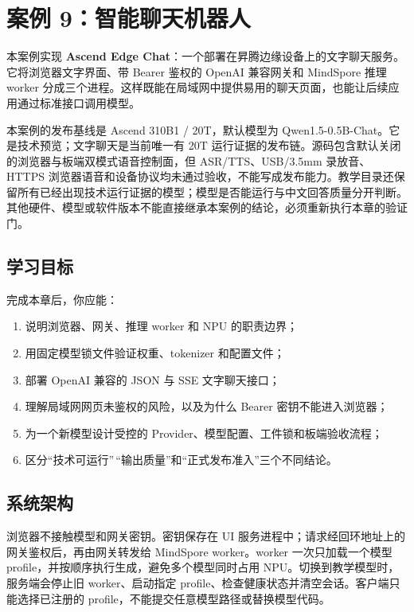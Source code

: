 \chapter{案例
9：智能聊天机器人}\label{ux6848ux4f8b-9ux667aux80fdux804aux5929ux673aux5668ux4eba}

本案例实现 \textbf{Ascend Edge
Chat}：一个部署在昇腾边缘设备上的文字聊天服务。它将浏览器文字界面、带
Bearer 鉴权的 OpenAI 兼容网关和 MindSpore 推理 worker
分成三个进程。这样既能在局域网中提供易用的聊天页面，也能让后续应用通过标准接口调用模型。

本案例的发布基线是 Ascend 310B1 / 20T，默认模型为
Qwen1.5-0.5B-Chat。它是技术预览；文字聊天是当前唯一有 20T
运行证据的发布链。源码包含默认关闭的浏览器与板端双模式语音控制面，但
ASR/TTS、USB/3.5mm 录放音、HTTPS
浏览器语音和设备协议均未通过验收，不能写成发布能力。教学目录还保留所有已经出现技术运行证据的模型；模型是否能运行与中文回答质量分开判断。其他硬件、模型或软件版本不能直接继承本案例的结论，必须重新执行本章的验证门。

\section{学习目标}\label{ux5b66ux4e60ux76eeux6807}

完成本章后，你应能：

\begin{enumerate}
\def\labelenumi{\arabic{enumi}.}
\tightlist
\item
  说明浏览器、网关、推理 worker 和 NPU 的职责边界；
\item
  用固定模型锁文件验证权重、tokenizer 和配置文件；
\item
  部署 OpenAI 兼容的 JSON 与 SSE 文字聊天接口；
\item
  理解局域网网页未鉴权的风险，以及为什么 Bearer 密钥不能进入浏览器；
\item
  为一个新模型设计受控的 Provider、模型配置、工件锁和板端验收流程；
\item
  区分``技术可运行''\,``输出质量''和``正式发布准入''三个不同结论。
\end{enumerate}

\section{系统架构}\label{ux7cfbux7edfux67b6ux6784}

浏览器不接触模型和网关密钥。密钥保存在 UI
服务进程中；请求经回环地址上的网关鉴权后，再由网关转发给 MindSpore
worker。worker 一次只加载一个模型
profile，并按顺序执行生成，避免多个模型同时占用
NPU。切换到教学模型时，服务端会停止旧 worker、启动指定
profile、检查健康状态并清空会话。客户端只能选择已注册的
profile，不能提交任意模型路径或替换模型代码。

